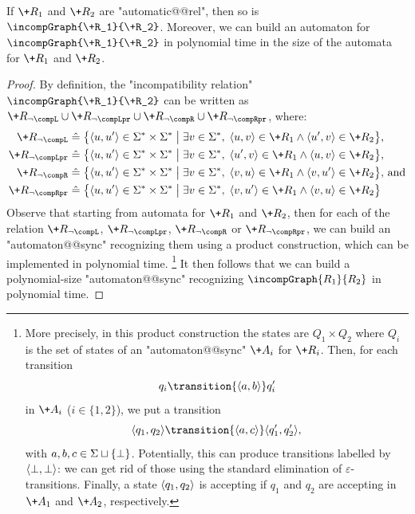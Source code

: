 \begin{proposition}
    \AP\label{prop:incomp-is-automatic}
    If $\+R_1$ and $\+R_2$ are "automatic@@rel", then so is $\incompGraph{\+R_1}{\+R_2}$.
    Moreover, we can build an automaton for $\incompGraph{\+R_1}{\+R_2}$ in polynomial time in the size of the automata for $\+R_1$ and $\+R_2$.
\end{proposition}

\begin{proof}
    By definition, the "incompatibility relation" $\incompGraph{\+R_1}{\+R_2}$ can be written as
    $\+R_{\neg\compL} \cup \+R_{\neg\compLpr} \cup \+R_{\neg\compR} \cup \+R_{\neg\compRpr}$, where:
    \begin{align*}
        \+R_{\neg\compL} &\defeq \big\{ \tup{u,u'} \in \Sigma^* \times \Sigma^* \;\big\vert\; \exists v \in \Sigma^*,\; \tup{u,v} \in \+R_1 \land \tup{u',v} \in \+R_2 \big\} \text{,}\\
        \+R_{\neg\compLpr} &\defeq \big\{ \tup{u,u'} \in \Sigma^* \times \Sigma^* \;\big\vert\; \exists v \in \Sigma^*,\; \tup{u',v} \in \+R_1 \land \tup{u,v} \in \+R_2 \big\} \text{,}\\
        \+R_{\neg\compR} &\defeq \big\{ \tup{u,u'} \in \Sigma^* \times \Sigma^* \;\big\vert\; \exists v \in \Sigma^*,\; \tup{v,u} \in \+R_1 \land \tup{v,u'} \in \+R_2 \big\} \text{, and}\\
        \+R_{\neg\compRpr} &\defeq \big\{ \tup{u,u'} \in \Sigma^* \times \Sigma^* \;\big\vert\; \exists v \in \Sigma^*,\; \tup{v,u'} \in \+R_1 \land \tup{v,u} \in \+R_2 \big\}
    \end{align*}
    Observe that starting from automata for $\+R_1$ and $\+R_2$, then for each
    of the relation $\+R_{\neg\compL}$, $\+R_{\neg\compLpr}$, $\+R_{\neg\compR}$ or $\+R_{\neg\compRpr}$, we can build an "automaton@@sync" recognizing them
    using a product construction, which can be implemented in polynomial time.%
    \footnote[][-2cm]{More precisely, in this product construction the states are $Q_1 \times Q_2$
    where $Q_i$ is the set of states of an "automaton@@sync" $\+A_i$ for $\+R_i$. Then,
    for each transition
    \[
        q_i \transition{\tup{a,b}} q'_i
    \]
    in $\+A_i$
    ($i \in \{1,2\}$), we put a transition
    \[
        \tup{q_1,q_2} \transition{\tup{a,c}} \tup{q'_1,q'_2},
    \]
    with $a,b,c \in \Sigma\sqcup\{\bot\}$. Potentially, this
    can produce transitions labelled by $\langle\bot,\bot\rangle$: we can get rid of those
    using the standard elimination of $\varepsilon$-transitions.
    Finally, a state $\langle q_1,q_2\rangle$ is accepting if $q_1$ and $q_2$ are accepting
    in $\+A_1$ and $\+A_2$, respectively.}
    It then follows that we can build a polynomial-size "automaton@@sync" recognizing
    $\incompGraph{R_1}{R_2}$ in polynomial time.
\end{proof}

